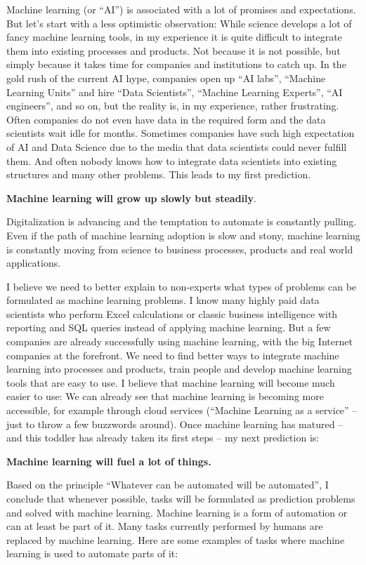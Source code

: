 \documentclass[12pt,]{krantz}
\begin{document}
Machine learning (or ``AI'') is associated with a lot of promises and
expectations. But let's start with a less optimistic observation: While
science develops a lot of fancy machine learning tools, in my experience
it is quite difficult to integrate them into existing processes and
products. Not because it is not possible, but simply because it takes
time for companies and institutions to catch up. In the gold rush of the
current AI hype, companies open up ``AI labs'', ``Machine Learning
Units'' and hire ``Data Scientists'', ``Machine Learning Experts'', ``AI
engineers'', and so on, but the reality is, in my experience, rather
frustrating. Often companies do not even have data in the required form
and the data scientists wait idle for months. Sometimes companies have
such high expectation of AI and Data Science due to the media that data
scientists could never fulfill them. And often nobody knows how to
integrate data scientists into existing structures and many other
problems. This leads to my first prediction.

\textbf{Machine learning will grow up slowly but steadily}.

Digitalization is advancing and the temptation to automate is constantly
pulling. Even if the path of machine learning adoption is slow and
stony, machine learning is constantly moving from science to business
processes, products and real world applications.

I believe we need to better explain to non-experts what types of
problems can be formulated as machine learning problems. I know many
highly paid data scientists who perform Excel calculations or classic
business intelligence with reporting and SQL queries instead of applying
machine learning. But a few companies are already successfully using
machine learning, with the big Internet companies at the forefront. We
need to find better ways to integrate machine learning into processes
and products, train people and develop machine learning tools that are
easy to use. I believe that machine learning will become much easier to
use: We can already see that machine learning is becoming more
accessible, for example through cloud services (``Machine Learning as a
service'' -- just to throw a few buzzwords around). Once machine
learning has matured -- and this toddler has already taken its first
steps -- my next prediction is:

\textbf{Machine learning will fuel a lot of things.}

Based on the principle ``Whatever can be automated will be automated'',
I conclude that whenever possible, tasks will be formulated as
prediction problems and solved with machine learning. Machine learning
is a form of automation or can at least be part of it. Many tasks
currently performed by humans are replaced by machine learning. Here are
some examples of tasks where machine learning is used to automate parts
of it:
\end{document}
